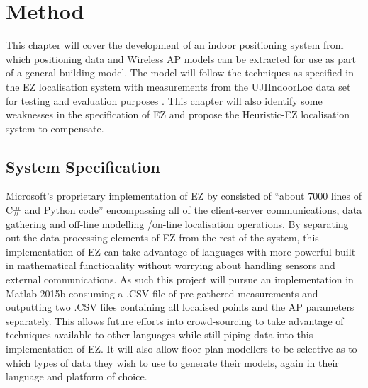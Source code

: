\documentclass{UoYCSproject}
\begin{document}
	\chapter{Method}
    \label{chap:method}
	
		This chapter will cover the development of an indoor positioning system from which positioning data and Wireless AP models can be extracted for use as part of a general building model. The  model will follow the techniques as specified in the EZ localisation system \citep{chintalapudi2010indoor} with measurements from the UJIIndoorLoc data set for testing and evaluation purposes \citep{torres2014ujiindoorloc}. This chapter will also identify some weaknesses in the specification of EZ and propose the Heuristic-EZ localisation system to compensate.
		
		\section{System Specification}
        \label{sec:sysspec}
            
            Microsoft's proprietary implementation of EZ by \citeauthor{chintalapudi2010indoor} consisted of ``about 7000 lines of C\# and Python code'' encompassing all of the client-server communications, data gathering and off-line modelling /on-line localisation operations. By separating out the data processing elements of EZ from the rest of the system, this implementation of EZ can take advantage of languages with more powerful built-in mathematical functionality without worrying about handling sensors and external communications. As such this project will pursue an implementation in Matlab 2015b consuming a .CSV file of pre-gathered measurements and outputting two .CSV files containing all localised points and the AP parameters separately. This allows future efforts into crowd-sourcing to take advantage of techniques available to other languages while still piping data into this implementation of EZ. It will also allow floor plan modellers to be selective as to which types of data they wish to use to generate their models, again in their language and platform of choice.
            
\end{document}
